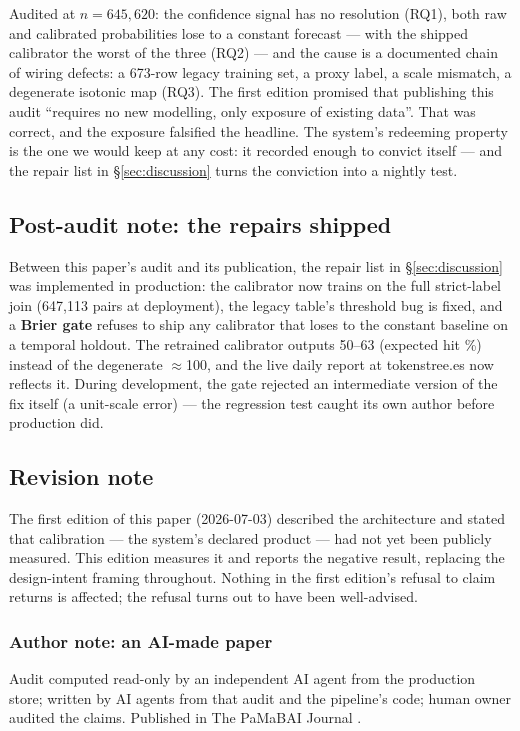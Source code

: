 \documentclass[10pt]{article}
\begin{document}
Audited at $n{=}645{,}620$: the confidence signal has no resolution (RQ1), both raw and calibrated probabilities lose to a constant forecast --- with the shipped calibrator the worst of the three (RQ2) --- and the cause is a documented chain of wiring defects: a 673-row legacy training set, a proxy label, a scale mismatch, a degenerate isotonic map (RQ3). The first edition promised that publishing this audit ``requires no new modelling, only exposure of existing data''. That was correct, and the exposure falsified the headline. The system's redeeming property is the one we would keep at any cost: it recorded enough to convict itself --- and the repair list in \S\ref{sec:discussion} turns the conviction into a nightly test.

\subsection*{Post-audit note: the repairs shipped}
Between this paper's audit and its publication, the repair list in \S\ref{sec:discussion} was implemented in production: the calibrator now trains on the full strict-label join (647{,}113 pairs at deployment), the legacy table's threshold bug is fixed, and a \textbf{Brier gate} refuses to ship any calibrator that loses to the constant baseline on a temporal holdout. The retrained calibrator outputs 50--63 (expected hit \%) instead of the degenerate $\approx$100, and the live daily report at tokenstree.es now reflects it. During development, the gate rejected an intermediate version of the fix itself (a unit-scale error) --- the regression test caught its own author before production did.

\subsection*{Revision note}
The first edition of this paper (2026-07-03) described the architecture and stated that calibration --- the system's declared product --- had not yet been publicly measured. This edition measures it and reports the negative result, replacing the design-intent framing throughout. Nothing in the first edition's refusal to claim returns is affected; the refusal turns out to have been well-advised.

\subsubsection*{Author note: an AI-made paper}
Audit computed read-only by an independent AI agent from the production store; written by AI agents from that audit and the pipeline's code; human owner audited the claims. Published in The PaMaBAI Journal \citep{pamabai2026}.
\end{document}
